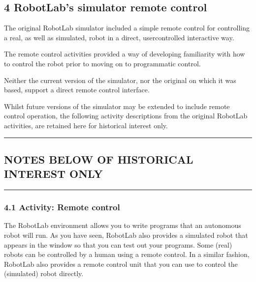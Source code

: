 \documentclass[letterpaper,10pt,english]{sphinxmanual}
\begin{document}
\subsection{4 RobotLab’s simulator remote control}
\label{\detokenize{content/00_SOFTWARE_GUIDE/Section_00_04_LEGACY_UNUSED_IGNORE:4-RobotLab_u2019s-simulator-remote-control}}\label{\detokenize{content/00_SOFTWARE_GUIDE/Section_00_04_LEGACY_UNUSED_IGNORE::doc}}
The original RobotLab simulator included a simple remote control for controlling a real, as well as simulated, robot in a direct, user\sphinxhyphen{}controlled interactive way.

The remote control activities provided a way of developing familiarity with how to control the robot prior to moving on to programmatic control.

Neither the current version of the  simulator, nor the original  on which it was based, support a direct remote control interface.

Whilst future versions of the simulator may be extended to include remote control operation, the following activity descriptions from the original RobotLab activities, are retained here for historical interest only.


\bigskip\hrule\bigskip



\subsection{NOTES BELOW OF HISTORICAL INTEREST ONLY}
\label{\detokenize{content/00_SOFTWARE_GUIDE/Section_00_04_LEGACY_UNUSED_IGNORE:NOTES-BELOW-OF-HISTORICAL-INTEREST-ONLY}}

\bigskip\hrule\bigskip



\subsubsection{4.1 Activity: Remote control}
\label{\detokenize{content/00_SOFTWARE_GUIDE/Section_00_04_LEGACY_UNUSED_IGNORE:4.1-Activity:-Remote-control}}
The RobotLab environment allows you to write programs that an autonomous robot will run. As you have seen, RobotLab also provides a simulated robot that appears in the  window so that you can test out your programs. Some (real) robots can be controlled by a human using a remote control. In a similar fashion, RobotLab also provides a remote control unit that you can use to control the (simulated) robot directly.
\end{document}
